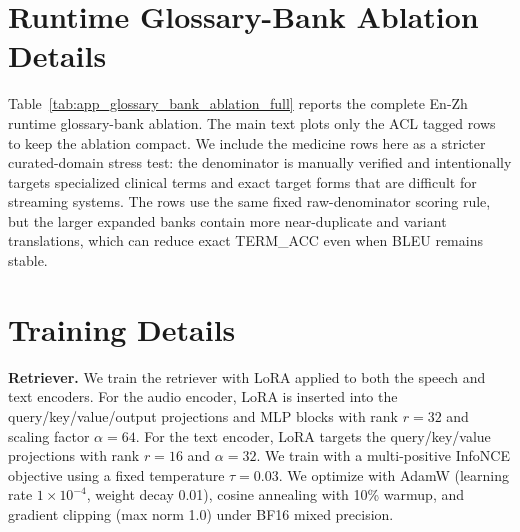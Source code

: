 \section{Runtime Glossary-Bank Ablation Details}
\label{app:glossary_bank_ablation}

Table~\ref{tab:app_glossary_bank_ablation_full} reports the complete En-Zh runtime glossary-bank ablation. The main text plots only the ACL tagged rows to keep the ablation compact. We include the medicine rows here as a stricter curated-domain stress test: the denominator is manually verified and intentionally targets specialized clinical terms and exact target forms that are difficult for streaming systems. The rows use the same fixed raw-denominator scoring rule, but the larger expanded banks contain more near-duplicate and variant translations, which can reduce exact TERM\_ACC even when BLEU remains stable.



\section{Training Details}\label{app:training_details}

\textbf{Retriever.}
We train the retriever with LoRA applied to both the speech and text encoders.
For the audio encoder, LoRA is inserted into the query/key/value/output projections and MLP blocks with rank $r{=}32$ and scaling factor $\alpha{=}64$.
For the text encoder, LoRA targets the query/key/value projections with rank $r{=}16$ and $\alpha{=}32$.
We train with a multi-positive InfoNCE objective using a fixed temperature $\tau{=}0.03$.
We optimize with AdamW (learning rate $1\times10^{-4}$, weight decay 0.01), cosine annealing with 10\% warmup, and gradient clipping (max norm 1.0) under BF16 mixed precision.
